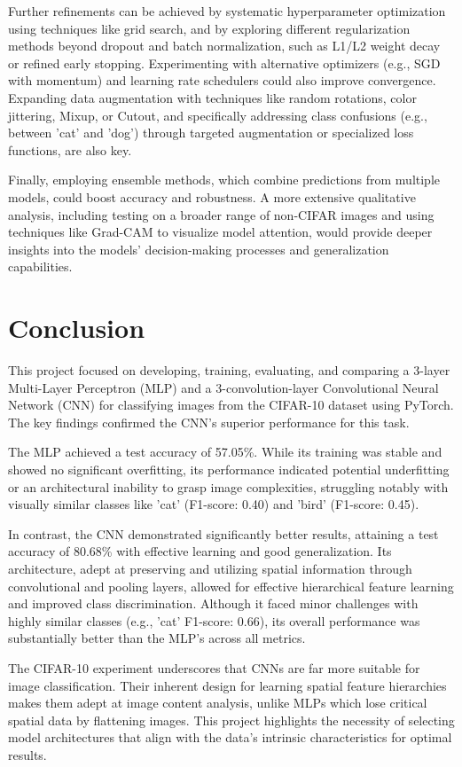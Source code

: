 \documentclass[12pt, a4paper]{report}
\begin{document}
Further refinements can be achieved by systematic hyperparameter optimization using techniques like grid search, and by exploring different regularization methods beyond dropout and batch normalization, such as L1/L2 weight decay or refined early stopping.
Experimenting with alternative optimizers (e.g., SGD with momentum) and learning rate schedulers could also improve convergence.
Expanding data augmentation with techniques like random rotations, color jittering, Mixup, or Cutout, and specifically addressing class confusions (e.g., between 'cat' and 'dog') through targeted augmentation or specialized loss functions, are also key.

Finally, employing ensemble methods, which combine predictions from multiple models, could boost accuracy and robustness.
A more extensive qualitative analysis, including testing on a broader range of non-CIFAR images and using techniques like Grad-CAM to visualize model attention, would provide deeper insights into the models' decision-making processes and generalization capabilities.

\chapter{Conclusion}
This project focused on developing, training, evaluating, and comparing a 3-layer Multi-Layer Perceptron (MLP) and a 3-convolution-layer Convolutional Neural Network (CNN) for classifying images from the CIFAR-10 dataset using PyTorch.
The key findings confirmed the CNN's superior performance for this task.

The MLP achieved a test accuracy of 57.05\%.
While its training was stable and showed no significant overfitting, its performance indicated potential underfitting or an architectural inability to grasp image complexities, struggling notably with visually similar classes like 'cat' (F1-score: 0.40) and 'bird' (F1-score: 0.45).

In contrast, the CNN demonstrated significantly better results, attaining a test accuracy of 80.68\% with effective learning and good generalization.
Its architecture, adept at preserving and utilizing spatial information through convolutional and pooling layers, allowed for effective hierarchical feature learning and improved class discrimination.
Although it faced minor challenges with highly similar classes (e.g., 'cat' F1-score: 0.66), its overall performance was substantially better than the MLP's across all metrics.

The CIFAR-10 experiment underscores that CNNs are far more suitable for image classification.
Their inherent design for learning spatial feature hierarchies makes them adept at image content analysis, unlike MLPs which lose critical spatial data by flattening images.
This project highlights the necessity of selecting model architectures that align with the data's intrinsic characteristics for optimal results.
\end{document}
